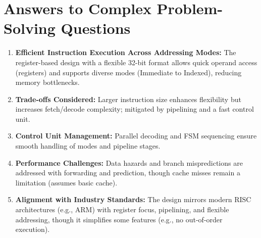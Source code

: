 \documentclass[a4paper,12pt]{article}
\begin{document}
\section{Answers to Complex Problem-Solving Questions}
\begin{enumerate}
    \item \textbf{Efficient Instruction Execution Across Addressing Modes:} The register-based design with a flexible 32-bit format allows quick operand access (registers) and supports diverse modes (Immediate to Indexed), reducing memory bottlenecks.
    \item \textbf{Trade-offs Considered:} Larger instruction size enhances flexibility but increases fetch/decode complexity; mitigated by pipelining and a fast control unit.
    \item \textbf{Control Unit Management:} Parallel decoding and FSM sequencing ensure smooth handling of modes and pipeline stages.
    \item \textbf{Performance Challenges:} Data hazards and branch mispredictions are addressed with forwarding and prediction, though cache misses remain a limitation (assumes basic cache).
    \item \textbf{Alignment with Industry Standards:} The design mirrors modern RISC architectures (e.g., ARM) with register focus, pipelining, and flexible addressing, though it simplifies some features (e.g., no out-of-order execution).
\end{enumerate}
\end{document}
